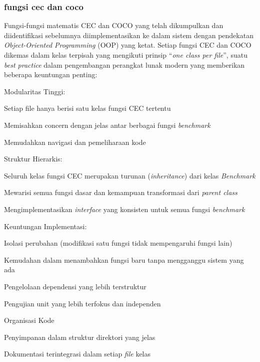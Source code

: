 \subsubsection{fungsi cec dan coco}
Fungsi-fungsi matematis CEC dan COCO yang telah dikumpulkan dan diidentifikasi sebelumnya diimplementasikan ke dalam sistem dengan pendekatan \textit{Object-Oriented Programming} (OOP) yang ketat. Setiap fungsi CEC dan COCO dikemas dalam kelas terpisah yang mengikuti prinsip \foreignlanguage{english}{\enquote{\textit{one class per file}}}, suatu \textit{best practice} dalam pengembangan perangkat lunak modern yang memberikan beberapa keuntungan penting:
\begin{packed_enum}
	\item Modularitas Tinggi:
    \begin{packed_enum}
      \item Setiap file hanya berisi satu kelas fungsi CEC tertentu
      \item Memisahkan concern dengan jelas antar berbagai fungsi \textit{benchmark}
      \item Memudahkan navigasi dan pemeliharaan kode
    \end{packed_enum}
	\item Struktur Hierarkis:
    \begin{packed_enum}
      \item Seluruh kelas fungsi CEC merupakan turunan (\textit{inheritance}) dari kelas \textit{Benchmark}
      \item Mewarisi semua fungsi dasar dan kemampuan transformasi dari \textit{parent class} 
      \item Mengimplementasikan \textit{interface} yang konsisten untuk semua fungsi \textit{benchmark}
    \end{packed_enum}
	\item Keuntungan Implementasi:
    \begin{packed_enum}
      \item Isolasi perubahan (modifikasi satu fungsi tidak mempengaruhi fungsi lain)
      \item Kemudahan dalam menambahkan fungsi baru tanpa mengganggu sistem yang ada 
      \item Pengelolaan dependensi yang lebih terstruktur
      \item Pengujian unit yang lebih terfokus dan independen
    \end{packed_enum}
	\item Organisasi Kode
	\item Penyimpanan dalam struktur direktori yang jelas
	\item Dokumentasi terintegrasi dalam setiap \textit{file} kelas
\end{packed_enum}

